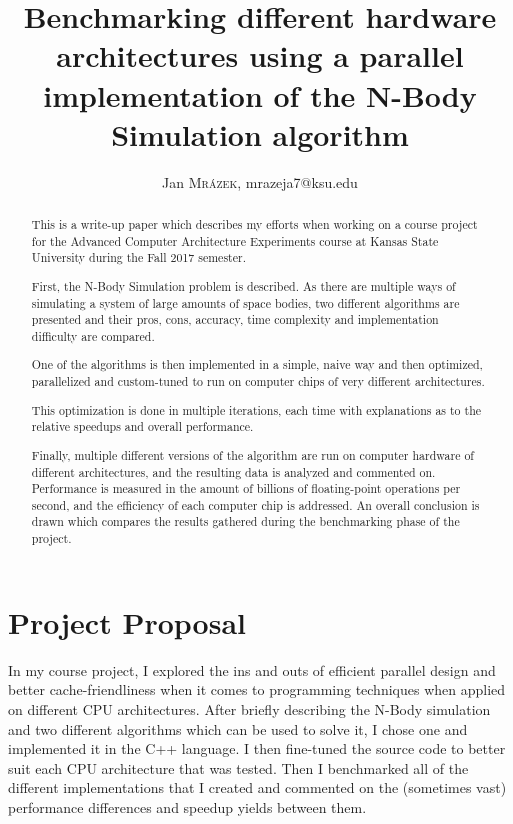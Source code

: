 \documentclass[journal]{IEEEtran}
\begin{document}
	\title{Benchmarking different hardware architectures using a parallel implementation of the N-Body Simulation algorithm}
	\author{{Jan \textsc{Mrázek}}, {mrazeja7@ksu.edu}}
	
	\maketitle
	
	\begin{abstract}
		
		This is a write-up paper which describes my efforts when working on a course project for the Advanced Computer Architecture Experiments course at Kansas State University during the Fall 2017 semester.
		
		First, the N-Body Simulation problem is described. As there are multiple ways of simulating a system of large amounts of space bodies, two different algorithms are presented and their pros, cons, accuracy, time complexity and implementation difficulty are compared. 
		
		One of the algorithms is then implemented in a simple, naive way and then optimized, parallelized and custom-tuned to run on computer chips of very different architectures. 
		
		This optimization is done in multiple iterations, each time with explanations as to the relative speedups and overall performance.
		
		Finally, multiple different versions of the algorithm are run on computer hardware of different architectures, and the resulting data is analyzed and commented on. Performance is measured in the amount of billions of floating-point operations per second, and the efficiency of each computer chip is addressed. An overall conclusion is drawn which compares the results gathered during the benchmarking phase of the project.
		
	\end{abstract}

	\section{Project Proposal}
		
		In my course project, I explored the ins and outs of efficient parallel design and better cache-friendliness when it comes to programming techniques when applied on different CPU architectures. After briefly describing the N-Body simulation and two different algorithms which can be used to solve it, I chose one and implemented it in the C++ language. I then fine-tuned the source code to better suit each CPU architecture that was tested. Then I benchmarked all of the different implementations that I created and commented on the (sometimes vast) performance differences and speedup yields between them.	
	
\end{document}
